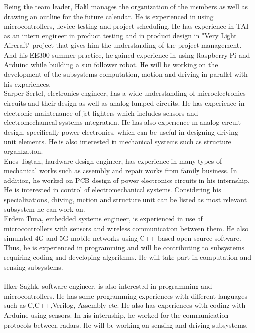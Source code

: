 \documentclass[a4paper,12pt]{article}
\begin{document}
	Being the team leader, Halil manages the organization of the members as well as drawing an outline for the future calendar. He is experienced in using microcontrollers, device testing and project scheduling. He has experience in TAI as an intern engineer in product testing and in product design in "Very Light Aircraft" project that gives him the understanding of the project management. And his EE300 summer practice, he gained experience in using Raspberry Pi and Arduino while building a sun follower robot. He will be working on the development of the subsystems computation, motion and driving in parallel with his experiences.\\
	
	Sarper Sertel, electronics engineer, has a wide understanding of microelectronics circuits and their design as well as analog lumped circuits. He has experience in electronic maintenance of jet fighters which includes sensors and electromechanical systems integration. He has also experience in  analog circuit design, specifically power electronics, which can be useful in designing driving unit elements. He is also interested in mechanical systems such as structure organization.\\
	
	Enes Taştan, hardware design engineer, has experience in many types of mechanical works such as assembly and repair works from family business. In addition, he worked on PCB design of power electronics circuits in his internship. He is interested in control of electromechanical systems. Considering his specializations, driving, motion and structure unit can be listed as most relevant subsystem he can work on.\\
	
	Erdem Tuna, embedded systems engineer, is experienced in use of microcontrollers with sensors and wireless communication between them. He also simulated 4G and 5G mobile networks using C++ based open source software. Thus, he is experienced in programming and will be contributing to subsystems requiring coding and developing algorithms. He will take part in computation and sensing subsystems.\\
	\\
	
	İlker Sağlık, software engineer, is also interested in programming and microcontrollers. He has some programming experiences with different languages such as C,C++,Verilog, Assembly etc. He also has experiences with coding with Arduino using sensors. In his internship, he worked for the communication protocols between radars. He will be working on sensing and driving subsystems.
\end{document}
